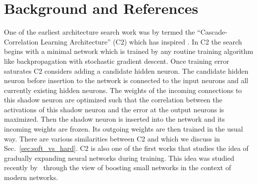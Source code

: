 \section{Background and References}
\label{sec:nas_background}

One of the earliest architecture search work was by \cite{cascadecorr} termed the ``Cascade-Correlation Learning Architecture'' (C2) which has inspired \Petridish. In C2 the search begins with a minimal network which is trained by any routine training algorithm like backpropagation with stochastic gradient descent. Once training error saturates C2 considers adding a candidate hidden neuron. The candidate hidden neuron before insertion to the network is connected to the input neurons and all currently existing hidden neurons. The weights of the incoming connections to this shadow neuron are optimized such that the correlation between the activations of this shadow neuron and the error at the output neurons is maximized. Then the shadow neuron is inserted into the network and its incoming weights are frozen. Its outgoing weights are then trained in the usual way. There are various similarities between C2 and \Petridish which we discuss in Sec.~\ref{sec:soft_vs_hard}.
C2 is also one of the first works that studies the idea of gradually expanding neural networks during training. This idea was studied recently by~\citep{adanet, boostedresnet} through the view of boosting small networks in the context of modern networks. 

